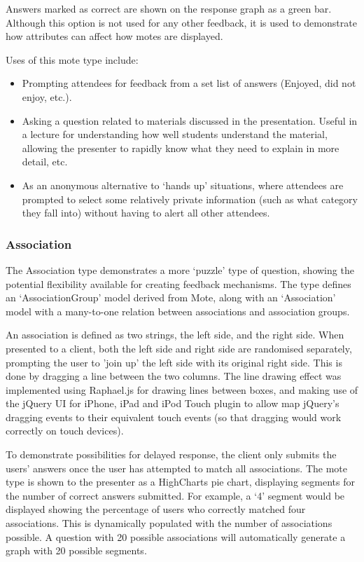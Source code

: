 \documentclass[a4papert,11pt,notitlepage]{ltxdoc}
\begin{document}
Answers marked as correct are shown on the response graph as a green bar. Although this option is not used for any other feedback, it is used to demonstrate how attributes can affect how motes are displayed.

Uses of this mote type include:
\begin{itemize}
\item Prompting attendees for feedback from a set list of answers (Enjoyed, did not enjoy, etc.). 
\item Asking a question related to materials discussed in the presentation. Useful in a lecture for understanding how well students understand the material, allowing the presenter to rapidly know what they need to explain in more detail, etc.
\item As an anonymous alternative to `hands up' situations, where attendees are prompted to select some relatively private information (such as what category they fall into) without having to alert all other attendees.
\end{itemize}

\subsubsection{Association}
The Association type demonstrates a more `puzzle' type of question, showing the potential flexibility available for creating feedback mechanisms. The type defines an `AssociationGroup' model derived from Mote, along with an `Association' model with a many-to-one relation between associations and association groups. 

An association is defined as two strings, the left side, and the right side. When presented to a client, both the left side and right side are randomised separately, prompting the user to 'join up' the left side with its original right side. This is done by dragging a line between the two columns. The line drawing effect was implemented using Raphael.js\cite{raphaeljs:web} for drawing lines between boxes, and making use of the jQuery UI for iPhone, iPad and iPod Touch\cite{jqueryuiipad:web} plugin to allow map jQuery's dragging events to their equivalent touch events (so that dragging would work correctly on touch devices).

To demonstrate possibilities for delayed response, the client only submits the users' answers once the user has attempted to match all associations. The mote type is shown to the presenter as a  HighCharts pie chart, displaying segments for the number of correct answers submitted. For example, a `4' segment would be displayed showing the percentage of users who correctly matched four associations. This is dynamically populated with the number of associations possible. A question with 20 possible associations will automatically generate a graph with 20 possible segments.
\end{document}
